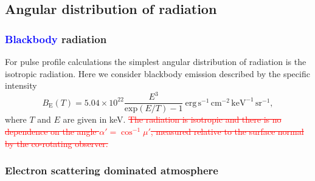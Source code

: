\documentclass{aa}
\newcommand{\refe}[1]{\textcolor{blue}{{#1}}}
\newcommand{\refedel}[1]{\textcolor{red}{\sout{#1}}}
\begin{document}
\subsection{Angular distribution of radiation}\label{sect:angular_distr}
\subsubsection{\refe{Blackbody} radiation}

For pulse profile calculations the simplest angular distribution of radiation is the isotropic radiation.
Here we consider blackbody emission described by the specific intensity
\begin{equation}
  B_{\mathrm{E}}(T) = 5.04 \times 10^{22} \frac{E^3}{\mathrm{exp}(E/T) -1}~\mathrm{erg}\,\mathrm{s}^{-1}\,\mathrm{cm}^{-2}\,\mathrm{keV}^{-1}\,\mathrm{sr}^{-1},
\end{equation}
where $T$ and $E$ are given in keV.
\refedel{The radiation is isotropic and there is no dependence on the angle $\alpha'=\cos^{-1}\mu'$, measured relative to the surface normal by the co-rotating observer.}


\subsubsection{Electron scattering dominated atmosphere}
\end{document}
